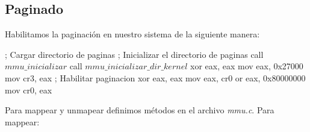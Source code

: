 \subsection{Paginado}
Habilitamos la paginaci\'on en nuestro sistema de la siguiente manera:
\begin{algorithmic}
    \State \tab ; Cargar directorio de paginas
    \State \tab ; Inicializar el directorio de paginas
    \State \tab call $mmu\_inicializar$
    \State \tab call $mmu\_inicializar\_dir\_kernel$
    \State \tab xor eax, eax
    \State \tab mov eax, 0x27000
    \State \tab mov cr3, eax
    \State \tab ; Habilitar paginacion
    \State \tab xor eax, eax
    \State \tab mov eax, cr0
    \State \tab or eax, 0x80000000
    \State \tab mov cr0, eax
\end{algorithmic}

Para mappear y unmapear definimos m\'etodos en el archivo \textit{mmu.c}.
Para mappear:
